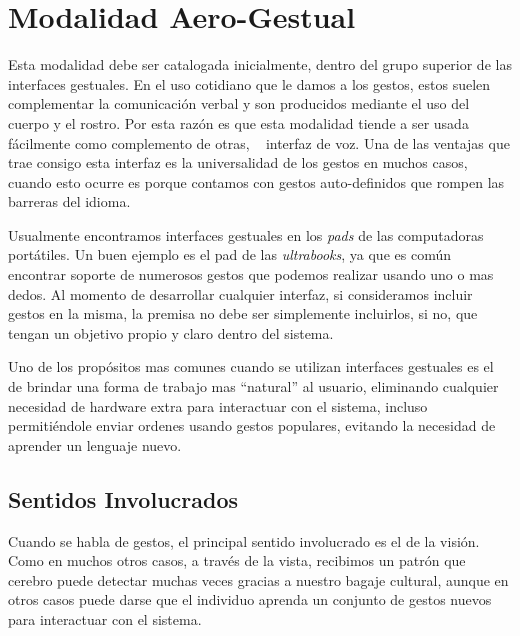 
\chapter{Modalidad Aero-Gestual} %

\label{ch:mod_air} 
Esta modalidad debe ser catalogada inicialmente, dentro del grupo superior de las interfaces gestuales. 
En el uso cotidiano que le damos a los gestos, estos suelen complementar la comunicación verbal y son producidos mediante el uso del cuerpo y el rostro. Por esta razón es que esta modalidad tiende a ser usada fácilmente como complemento de otras, \ie~ interfaz de voz.
Una de las ventajas que trae consigo esta interfaz es la universalidad de los gestos en muchos casos, cuando esto ocurre es porque contamos con gestos auto-definidos que rompen las barreras del idioma.

Usualmente encontramos interfaces gestuales en los \emph{pads} de las computadoras portátiles. Un buen ejemplo es el pad de las \emph{ultrabooks}, ya que es común encontrar soporte de numerosos gestos que podemos realizar usando uno o mas dedos.
Al momento de desarrollar cualquier interfaz, si consideramos incluir gestos en la misma, la premisa no debe ser simplemente incluirlos, si no, que tengan un objetivo propio y claro dentro del sistema. 

Uno de los propósitos mas comunes cuando se utilizan interfaces gestuales es el de brindar una forma de trabajo mas ``natural'' al usuario, eliminando cualquier necesidad de hardware extra para interactuar con el sistema, incluso permitiéndole enviar ordenes usando gestos populares, evitando la necesidad de aprender un lenguaje nuevo.

\section{Sentidos Involucrados}
Cuando se habla de gestos, el principal sentido involucrado es el de la visión. Como en muchos otros casos, a través de la vista, recibimos un patrón que cerebro puede detectar muchas veces gracias a nuestro bagaje cultural, aunque en otros casos puede darse que el individuo aprenda un conjunto de gestos nuevos para interactuar con el sistema.

